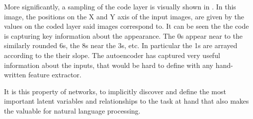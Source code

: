 \documentclass[12pt,parskip]{komatufte}
\begin{document}


More significantly, a sampling of the code layer is visually shown in .
In this image, the positions on the X and Y axis of the input images, are given by the values on the coded layer said images correspond to.
It can be seen the the code is capturing key information about the appearance.
The 0s appear near to the similarly rounded 6s,
the 8s near the 3s, etc.
In particular the 1s are arrayed according to the their slope.
The autoencoder has captured very useful information about the inputs, that would be hard to define with any hand-written feature extractor.

It is this property of networks, to implicitly discover and define the most important latent variables and relationships to the task at hand that also makes the valuable for natural language processing.
\end{document}
